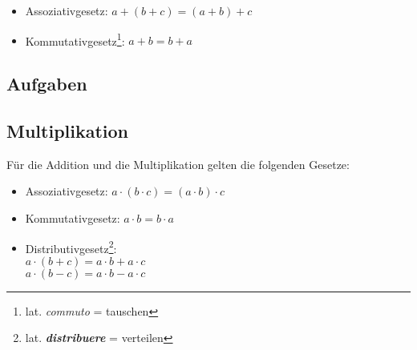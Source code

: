 \begin{gesetz}{}{}
 \begin{itemize}
  \item Assoziativgesetz: $a+(b+c) = (a+b)+c$
  \item Kommutativgesetz\footnote{lat. \textit{commuto} = tauschen}: $a + b = b + a$
 \end{itemize}
\end{gesetz}


\subsection*{Aufgaben}


\newpage
\subsection{Multiplikation}

Für die Addition und die Multiplikation gelten die folgenden
Gesetze:



\begin{gesetz}{}{}
\begin{itemize}
\item Assoziativgesetz: $a\cdot(b\cdot{}c) = (a\cdot b)\cdot c$
\item Kommutativgesetz:  $a\cdot b = b \cdot a$
\item Distributivgesetz\footnote{lat. \textit{\textbf{distribuere}} = verteilen}:\\
  $a\cdot (b+c) = a\cdot b + a\cdot c$\\
  $a\cdot (b-c) = a\cdot b - a\cdot c$\\
  
  \end{itemize}
\end{gesetz}

